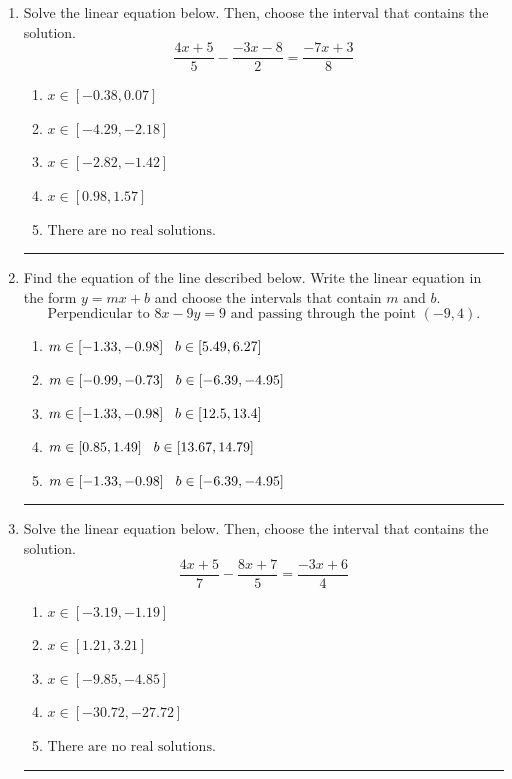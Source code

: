 \documentclass[14pt]{extbook}
\newcommand{\litem}[1]{\item#1\hspace*{-1cm}\rule{\textwidth}{0.4pt}}
\begin{document}
\begin{enumerate}
{\begin{enumerate}[label=\Alph*.]
\end{enumerate} }
\litem{
Solve the linear equation below. Then, choose the interval that contains the solution.\[ \frac{4x + 5}{5} - \frac{-3x -8}{2} = \frac{-7x + 3}{8} \]\begin{enumerate}[label=\Alph*.]
\item \( x \in [-0.38, 0.07] \)
\item \( x \in [-4.29, -2.18] \)
\item \( x \in [-2.82, -1.42] \)
\item \( x \in [0.98, 1.57] \)
\item \( \text{There are no real solutions.} \)

\end{enumerate} }
\litem{
Find the equation of the line described below. Write the linear equation in the form $ y=mx+b $ and choose the intervals that contain $m$ and $b$.\[ \text{Perpendicular to } 8 x - 9 y = 9 \text{ and passing through the point } (-9, 4). \]\begin{enumerate}[label=\Alph*.]
\item \( m \in [-1.33, -0.98] \hspace*{3mm} b \in [5.49, 6.27] \)
\item \( m \in [-0.99, -0.73] \hspace*{3mm} b \in [-6.39, -4.95] \)
\item \( m \in [-1.33, -0.98] \hspace*{3mm} b \in [12.5, 13.4] \)
\item \( m \in [0.85, 1.49] \hspace*{3mm} b \in [13.67, 14.79] \)
\item \( m \in [-1.33, -0.98] \hspace*{3mm} b \in [-6.39, -4.95] \)

\end{enumerate} }
\litem{
Solve the linear equation below. Then, choose the interval that contains the solution.\[ \frac{4x + 5}{7} - \frac{8x + 7}{5} = \frac{-3x + 6}{4} \]\begin{enumerate}[label=\Alph*.]
\item \( x \in [-3.19, -1.19] \)
\item \( x \in [1.21, 3.21] \)
\item \( x \in [-9.85, -4.85] \)
\item \( x \in [-30.72, -27.72] \)
\item \( \text{There are no real solutions.} \)


\end{enumerate}}
\end{enumerate}
\end{document}

